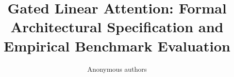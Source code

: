 \title{\textbf{Gated Linear Attention: Formal Architectural Specification and Empirical Benchmark Evaluation}}

\author{Anonymous authors}
